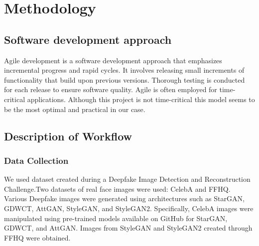     \chapter{Methodology}
       \section{Software development approach}
        Agile development is a software development approach that emphasizes incremental progress and rapid cycles. It involves releasing small increments of functionality that build upon previous versions. Thorough testing is conducted for each release to ensure software quality. Agile is often employed for time-critical applications. Although this project is not time-critical this model seems to be the most optimal and practical in our case.
        \begin{figure}[hbt!]
        \end{figure}
        \section{Description of Workflow}
        \subsection{Data Collection}
        We used dataset created during a Deepfake Image Detection and Reconstruction Challenge.Two datasets of real face images were used: CelebA and FFHQ. Various Deepfake images were generated using architectures such as StarGAN, GDWCT, AttGAN, StyleGAN, and StyleGAN2. Specifically, CelebA images were manipulated using pre-trained models available on GitHub for StarGAN, GDWCT, and AttGAN. Images from StyleGAN and StyleGAN2 created through FFHQ were obtained.
        

